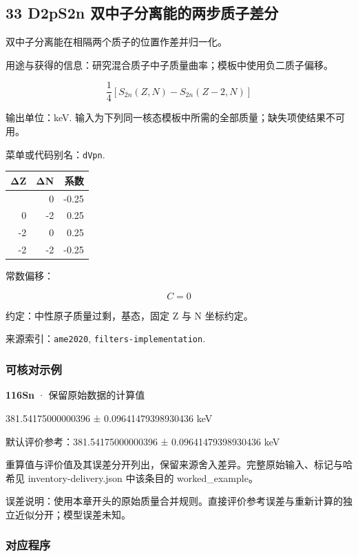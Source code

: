 \documentclass[
  11pt,
  letterpaper,
]{article}
\begin{document}
\subsection{33 D2pS2n
双中子分离能的两步质子差分}\label{d2ps2n-ux53ccux4e2dux5b50ux5206ux79bbux80fdux7684ux4e24ux6b65ux8d28ux5b50ux5deeux5206}

双中子分离能在相隔两个质子的位置作差并归一化。

用途与获得的信息：研究混合质子中子质量曲率；模板中使用负二质子偏移。

\[
\frac14[S_{2n}(Z,N)-S_{2n}(Z-2,N)]
\]

输出单位：keV.
输入为下列同一核态模板中所需的全部质量；缺失项使结果不可用。

菜单或代码别名：\texttt{dVpn}.

\begin{longtable}[]{@{}rrr@{}}
\toprule\noalign{}
ΔZ & ΔN & 系数 \\
\midrule\noalign{}
\endhead
\bottomrule\noalign{}
\endlastfoot
0 & 0 & -0.25 \\
0 & -2 & 0.25 \\
-2 & 0 & 0.25 \\
-2 & -2 & -0.25 \\
\end{longtable}

常数偏移：

\[
C=0
\]

约定：中性原子质量过剩，基态，固定 Z 与 N 坐标约定。

来源索引：\texttt{ame2020}, \texttt{filters-implementation}.

\subsubsection{可核对示例}\label{ux53efux6838ux5bf9ux793aux4f8b-32}

\textbf{116Sn} · 保留原始数据的计算值

381.54175000000396 ± 0.09641479398930436 keV

默认评价参考：381.54175000000396 ± 0.09641479398930436 keV

重算值与评价值及其误差分开列出，保留来源舍入差异。完整原始输入、标记与哈希见
inventory-delivery.json 中该条目的 worked\_example。

误差说明：使用本章开头的原始质量合并规则。直接评价参考误差与重新计算的独立近似分开；模型误差未知。

\subsubsection{对应程序}\label{ux5bf9ux5e94ux7a0bux5e8f-32}
\end{document}
